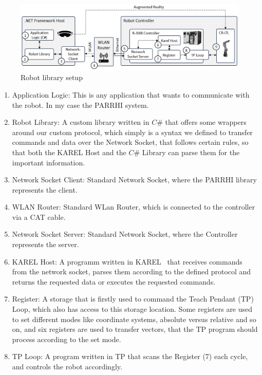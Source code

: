 \begin{figure}
	\centering
	\includegraphics[width=1\textwidth]{Figures/RobotArchitecture.jpg}
	\caption{Robot library setup}
	\label{Fig:RobotArchitecture}
\end{figure}

\begin{enumerate}
	\item Application Logic: This is any application that wants to communicate with the robot. In my case the PARRHI system.
	\item Robot Library: A custom library written in $C\#$ that offers some wrappers around our custom protocol, which simply is a syntax we defined to transfer commands and data over the Network Socket, that follows certain rules, so that both the KAREL Host and the $C\#$ Library can parse them for the important information.
	\item Network Socket Client: Standard Network Socket, where the PARRHI library represents the client.
	\item WLAN Router: Standard WLan Router, which is connected to the controller via a CAT cable.
	\item Network Socket Server: Standard Network Socket, where the Controller represents the server.
	\item KAREL Host: A programm written in KAREL~\cite{FanucKarel} that receives commands from the network socket, parses them according to the defined protocol and returns the requested data or executes the requested commands.
	\item Register: A storage that is firstly used to command the Teach Pendant (TP) Loop, which also has access to this storage location. Some registers are used to set different modes like coordinate systems, absolute versus relative and so on, and six registers are used to transfer vectors, that the TP program should process according to the set mode.
	\item TP Loop: A program written in TP that scans the Register (7) each cycle, and controls the robot accordingly.
\end{enumerate}

